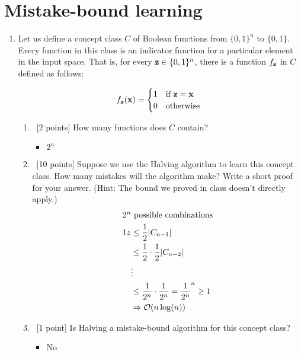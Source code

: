 \section{Mistake-bound learning}
\label{sec:mistake-bound-learning}

\begin{enumerate}
\item Let us define a concept class $C$ of Boolean functions from
  $\{0,1\}^n$ to $\{0, 1\}$. Every function in this class is an
  indicator function for a particular element in the input space. That
  is, for every ${\bf z} \in \{0, 1\}^n$, there is a function $f_{\bf z}$ in $C$
  defined as follows:

  \begin{equation}
    f_{\bf z}({\bf x}) = \begin{cases}
      1 & \mbox{if } {\bf z} = {\bf x} \\
      0 & \mbox{otherwise }
    \end{cases}
  \end{equation}

  \begin{enumerate}
  \item ~[2 points] How many functions does $C$ contain?
    \begin{itemize}
      \item $2^{n}$
    \end{itemize}
  \item ~[10 points] Suppose we use the Halving algorithm to learn this
    concept class. How many mistakes will the algorithm make? Write a
    short proof for your answer. (Hint: The bound we proved in class
    doesn't directly apply.)
    \begin{align}
      \intertext{$2^{n}$ possible combinations}
      1z &\leq \frac{1}{2}|C_{n-1}|\\
         &\leq \frac{1}{2}\cdot\frac{1}{2}|C_{n-2}|\\
         &\vdots\\
         &\leq \frac{1}{2^{n}}\cdot\frac{1}{2^{n}} = \frac{1}{2^{n}}^{n} \geq 1\\
         &\Rightarrow \mathcal{O}(n\log(n))
    \end{align}
  \item ~[1 point] Is Halving a mistake-bound algorithm for this
    concept class?
    \begin{itemize}
      \item No
    \end{itemize}
  \end{enumerate}


\end{enumerate}
